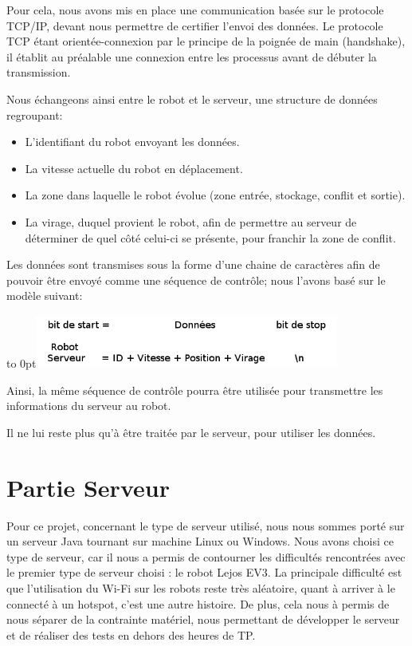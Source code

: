 \documentclass[french,a4paper,12pt]{report}
\begin{document}
Pour cela, nous avons mis en place une communication basée sur le protocole TCP/IP, devant nous permettre de certifier l'envoi des données. Le protocole TCP étant orientée-connexion par le principe de la poignée de main (handshake), il établit au préalable une connexion entre les processus avant de débuter la transmission.

Nous échangeons ainsi entre le robot et le serveur, une structure de données regroupant:
  \begin{itemize}
  \item L'identifiant du robot envoyant les données.
  \item La vitesse actuelle du robot en déplacement.
  \item La zone dans laquelle le robot évolue (zone entrée, stockage, conflit et sortie).
  \item La virage, duquel provient le robot, afin de permettre au serveur de déterminer de quel côté celui-ci se présente, pour franchir la zone de conflit.
  \end{itemize}
  
Les données sont transmises sous la forme d'une chaine de caractères afin de pouvoir être envoyé comme une séquence de contrôle; nous l'avons basé sur le modèle suivant:

\hfill\hbox to 0pt{\hss\includegraphics[width=10cm]{sequ.png}\hss}\hfill\null\newline

Ainsi, la même séquence de contrôle pourra être utilisée pour transmettre les informations du serveur au robot.

Il ne lui reste plus qu'à être traitée par le serveur, pour utiliser les données.

\section{Partie Serveur}%

Pour ce projet, concernant le type de serveur utilisé, nous nous sommes porté sur un serveur Java tournant sur machine Linux ou Windows.
Nous avons choisi ce type de serveur, car il nous a permis de contourner les difficultés rencontrées avec le premier type de serveur choisi : le robot Lejos EV3.
La principale difficulté est que l'utilisation du Wi-Fi sur les robots reste très aléatoire, quant à arriver à le connecté à un hotspot, c'est une autre histoire. De plus, cela nous à permis de nous séparer de la contrainte matériel, nous permettant de développer le serveur et de réaliser des tests en dehors des heures de TP.
\end{document}
